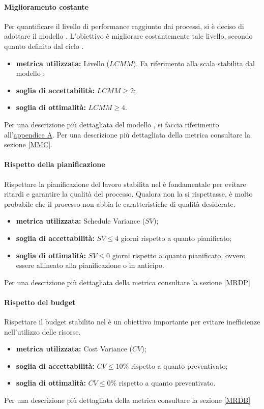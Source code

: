 \paragraph{Miglioramento costante} 
\label{OMC}
Per quantificare il livello di performance raggiunto dai processi, si è deciso di adottare il modello . L'obiettivo è migliorare costantemente tale livello, secondo quanto definito dal ciclo .
\begin{itemize}
	\item \textbf{metrica utilizzata:} Livello  ($LCMM$). Fa riferimento alla scala stabilita dal modello ;
	\item \textbf{soglia di accettabilità:} $LCMM \geq 2$;
	\item \textbf{soglia di ottimalità:} $LCMM \geq 4$.
\end{itemize}
Per una descrizione più dettagliata del modello , si faccia riferimento all'\hyperref[appendice A]{appendice A}.  %
Per una descrizione più dettagliata della metrica consultare la sezione \ref{MMC}.


\paragraph{Rispetto della pianificazione}
\label{ORDP}
Rispettare la pianificazione del lavoro stabilita nel \pdpv{} è fondamentale per evitare ritardi e garantire la qualità del processo. Qualora non la si rispettasse, è molto probabile che il processo non abbia le caratteristiche di qualità desiderate.
\begin{itemize}
	\item \textbf{metrica utilizzata:} Schedule Variance ($SV$);
	\item \textbf{soglia di accettabilità:} $SV\leq 4${} giorni rispetto a quanto pianificato;
	\item \textbf{soglia di ottimalità:} $SV\leq 0${} giorni rispetto a quanto pianificato, ovvero essere allineato alla pianificazione o in anticipo.
\end{itemize}
Per una descrizione più dettagliata della metrica consultare la sezione \ref{MRDP}

\paragraph{Rispetto del budget}
\label{ORDB}
Rispettare il budget stabilito nel \pdpv{} è un obiettivo importante per evitare inefficienze nell'utilizzo delle risorse.
\begin{itemize}
	\item \textbf{metrica utilizzata:} Cost Variance ($CV$);
	\item \textbf{soglia di accettabilità:} $CV\leq10\%$ rispetto a quanto preventivato;
	\item \textbf{soglia di ottimalità:} $CV\leq 0\%$ rispetto a quanto preventivato.
\end{itemize}
Per una descrizione più dettagliata della metrica consultare la sezione \ref{MRDB}

